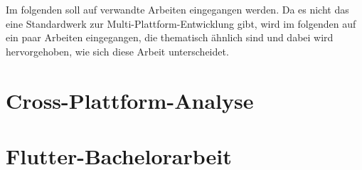 Im folgenden soll auf verwandte Arbeiten eingegangen werden. Da es nicht das eine Standardwerk zur Multi-Plattform-Entwicklung gibt, wird im folgenden auf ein paar Arbeiten eingegangen, die thematisch ähnlich sind und dabei wird hervorgehoben, wie sich diese Arbeit unterscheidet.

\section{Cross-Plattform-Analyse}


\section{Flutter-Bachelorarbeit}